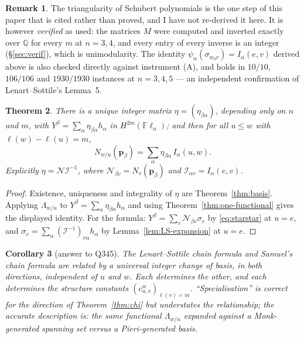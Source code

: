 \documentclass[11pt]{article}
\theoremstyle{plain}
\newtheorem{theorem}{Theorem}[section]
\newtheorem{corollary}[theorem]{Corollary}
\theoremstyle{definition}
\newtheorem{remark}[theorem]{Remark}
\DeclareMathOperator{\len}{\ell}
\newcommand{\Fl}{\mathbb{F}\ell}
\newcommand{\pv}{\mathbf{p}}
\begin{document}
\begin{remark}
The triangularity of Schubert polynomials is the one step of this paper that is
cited rather than proved, and I have not re-derived it here. It is however
\emph{verified} as used: the matrices $M$ were computed and inverted exactly
over $\mathbb{Q}$ for every $m$ at $n=3,4$, and every entry of every inverse is
an integer (\S\ref{sec:verif}), which is unimodularity. The identity
$\psi_\alpha(\sigma_{w_0v})=I_\alpha(e,v)$ derived above is also checked
directly against instrument (A), and holds in $10/10$, $106/106$ and
$1930/1930$ instances at $n=3,4,5$ --- an independent confirmation of
Lenart--Sottile's Lemma~5.
\end{remark}

\begin{theorem}\label{thm:eta}
There is a unique integer matrix $\eta=(\eta_{\beta\alpha})$, depending only on
$n$ and $m$, with $Y^\beta=\sum_\alpha\eta_{\beta\alpha}h_\alpha$ in
$H^{2m}(\Fl_n)$; and then for all $u\le w$ with $\len(w)-\len(u)=m$,
\[
  N_{w/u}(\pv_\beta)=\sum_\alpha \eta_{\beta\alpha}\,I_\alpha(u,w).
\]
Explicitly $\eta=\mathcal{N}\mathcal{I}^{-1}$, where
$\mathcal{N}_{\beta v}=N_v(\pv_\beta)$ and $\mathcal{I}_{\alpha v}=I_\alpha(e,v)$.
\end{theorem}

\begin{proof}
Existence, uniqueness and integrality of $\eta$ are Theorem~\ref{thm:basis}.
Applying $\Lambda_{w/u}$ to $Y^\beta=\sum_\alpha\eta_{\beta\alpha}h_\alpha$ and
using Theorem~\ref{thm:one-functional} gives the displayed identity. For the
formula: $Y^\beta=\sum_v\mathcal{N}_{\beta v}\sigma_v$ by \eqref{eq:starstar} at
$u=e$, and $\sigma_v=\sum_\alpha(\mathcal{I}^{-1})_{v\alpha}h_\alpha$ by
Lemma~\ref{lem:LS-expansion} at $u=e$.
\end{proof}

\begin{corollary}[answer to Q345]\label{cor:answer}
The Lenart--Sottile chain formula and Samuel's chain formula are related by a
universal integer change of basis, in both directions, independent of $u$ and
$w$. Each determines the other, and each determines the structure constants
$(c^w_{u,v})_{\len(v)=m}$. ``Specialisation'' is correct for the direction of
Theorem~\ref{thm:chi} but understates the relationship; the accurate
description is: \emph{the same functional $\Lambda_{w/u}$ expanded against a
Monk-generated spanning set versus a Pieri-generated basis.}
\end{corollary}
\end{document}
